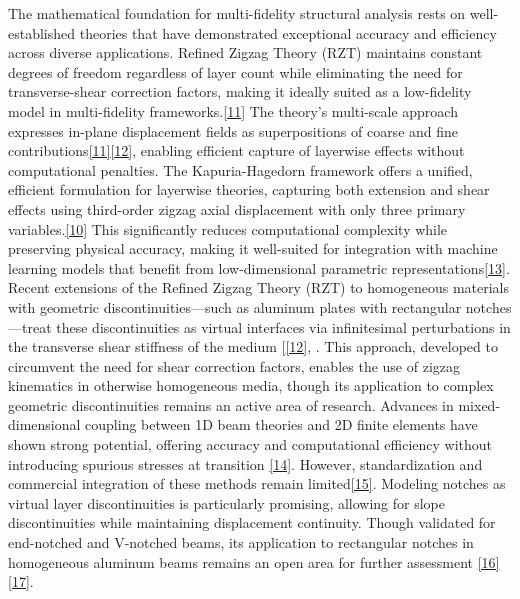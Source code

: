 \documentclass[12pt,a4paper]{report}
\begin{document}
The mathematical foundation for multi-fidelity structural analysis rests on well-established theories that have demonstrated exceptional accuracy and efficiency across diverse applications. Refined Zigzag Theory (RZT) maintains constant degrees of freedom regardless of layer count while eliminating the need for transverse-shear correction factors, making it ideally suited as a low-fidelity model in multi-fidelity frameworks.\href{https://www.sciencedirect.com/science/article/pii/S0263822315006819}{[11]} The theory's multi-scale approach expresses in-plane displacement fields as superpositions of coarse and fine contributions\href{https://www.sciencedirect.com/science/article/pii/S0263822315006819}{[11]}\href{https://link.springer.com/article/10.1007/s11012-015-0222-0}{[12]}, enabling efficient capture of layerwise effects without computational penalties. The Kapuria-Hagedorn framework offers a unified, efficient formulation for layerwise theories, capturing both extension and shear effects using third-order zigzag axial displacement with only three primary variables.\href{http://dx.doi.org/10.2140/jomms.2007.2.1267}{[10]} This significantly reduces computational complexity while preserving physical accuracy, making it well-suited for integration with machine learning models that benefit from low-dimensional parametric representations\href{https://www.sciencedirect.com/science/article/pii/S0045793018304250}{[13]}.
Recent extensions of the Refined Zigzag Theory (RZT) to homogeneous materials with geometric discontinuities—such as aluminum plates with rectangular notches—treat these discontinuities as virtual interfaces via infinitesimal perturbations in the transverse shear stiffness of the medium [\href{https://link.springer.com/article/10.1007/s11012-015-0222-0}{[12]}, . This approach, developed to circumvent the need for shear correction factors, enables the use of zigzag kinematics in otherwise homogeneous media, though its application to complex geometric discontinuities remains an active area of research.
Advances in mixed-dimensional coupling between 1D beam theories and 2D finite elements have shown strong potential, offering accuracy and computational efficiency without introducing spurious stresses at transition \href{https://publications.rwth-aachen.de/record/854218/files/854218.pdf?}{[14]}. However, standardization and commercial integration of these methods remain limited\href{https://doi.org/10.1115/1.1557614}{[15]}.
Modeling notches as virtual layer discontinuities is particularly promising, allowing for slope discontinuities while maintaining displacement continuity. Though validated for end-notched and V-notched beams, its application to rectangular notches in homogeneous aluminum beams remains an open area for further assessment \href{https://www.sciencedirect.com/science/article/pii/S0022460X24000774}{[16]}\href{https://research.sabanciuniv.edu/id/eprint/41426/1/10222508_Tabrizi_Isa_Emami.pdf}{[17]}.
\end{document}
